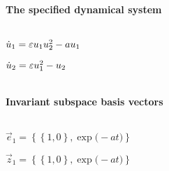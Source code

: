 
\(\)
\paragraph{The specified dynamical system}
\(
\)\par

\(\dot u_{1}=\varepsilon u\sb1 u\sb2^{2}-a u\sb1
\)\par

\(\dot u_{2}=\varepsilon u\sb1^{2}-u\sb2
\)\par

\(\)
\paragraph{Invariant subspace basis vectors}
\(
\)\par

\(\vec e_{1}=\left\{
\left\{
1 , 0
\right\} , \exp \big(-a t\big)
\right\}
\)\par

\(\vec z_{1}=\left\{
\left\{
1 , 0
\right\} , \exp \big(-a t\big)
\right\}
\)\par
